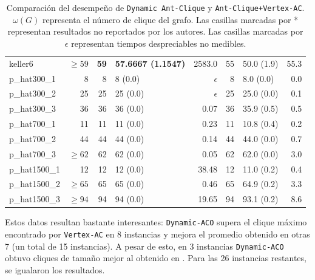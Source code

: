 \documentclass[conference]{IEEEtran}
\begin{document}
\begin{center}
\begin{table}[ht]
{\begin{tabular}{lr|rlr|rlr}
 keller6           &    $\geq 59$  &  \textbf{59}  &  \textbf{57.6667 (1.1547)}  &       2583.0  &    55  &  50.0 (1.9)     &        55.3  \\
 p\_hat300\_1      &            8  &            8  &  8 (0.0)                    &   $\epsilon$  &     8  &  8.0 (0.0)      &         0.0  \\
 p\_hat300\_2      &           25  &           25  &  25 (0.0)                   &   $\epsilon$  &    25  &  25.0 (0.0)     &         0.1  \\
 p\_hat300\_3      &           36  &           36  &  36 (0.0)                   &         0.07  &    36  &  35.9 (0.5)     &         0.5  \\
 p\_hat700\_1      &           11  &           11  &  11 (0.0)                   &         0.23  &    11  &  10.8 (0.4)     &         0.2  \\
 p\_hat700\_2      &           44  &           44  &  44 (0.0)                   &         0.14  &    44  &  44.0 (0.0)     &         0.7  \\
 p\_hat700\_3      &    $\geq 62$  &           62  &  62 (0.0)                   &         0.05  &    62  &  62.0 (0.0)     &         3.0  \\
 p\_hat1500\_1     &           12  &           12  &  12 (0.0)                   &        38.48  &    12  &  11.0 (0.2)     &         0.4  \\
 p\_hat1500\_2     &    $\geq 65$  &           65  &  65 (0.0)                   &         0.46  &    65  &  64.9 (0.2)     &         3.3  \\
 p\_hat1500\_3     &    $\geq 94$  &           94  &  94 (0.0)                   &        19.65  &    94  &  93.1 (0.2)     &         8.6  \\
\hline
\end{tabular}}
\hfill{}
\caption{Comparación del desempeño de \texttt{Dynamic Ant-Clique} y
  \texttt{Ant-Clique+Vertex-AC}. $\omega(G)$ representa el número de
  clique del grafo. Las casillas marcadas por * representan resultados
no reportados por los autores. Las casillas marcadas por $\epsilon$
representan tiempos despreciables no medibles.}
\label{tb:aco}
\end{table}
\end{center}

Estos datos resultan bastante interesantes: \texttt{Dynamic-ACO}
supera el clique máximo encontrado por \texttt{Vertex-AC} en 8
instancias y mejora el promedio obtenido en otras 7 (un total de 15
instancias). A pesar de esto, en 3 instancias \texttt{Dynamic-ACO}
obtuvo cliques de tamaño mejor al obtenido en \cite{aco2}. Para las
26 instancias restantes, se igualaron los resultados.
\end{document}
